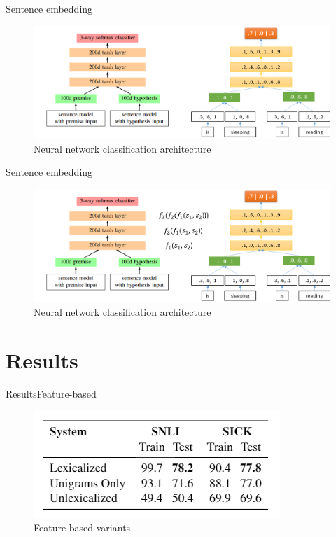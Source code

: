\documentclass{beamer}
\begin{document}
\begin{frame}{Sentence embedding}{\cite{snli:emnlp2015}}
  \begin{figure}[h]
    \centering
    \includegraphics[scale=0.38]{sentence_encoder}
    \caption{Neural network classification architecture}
  \end{figure}
\end{frame}

\begin{frame}{Sentence embedding}{\cite{snli:emnlp2015}}
  \begin{figure}[h]
    \centering
    \includegraphics[scale=0.38]{sentence_encoder2}
    \caption{Neural network classification architecture}
  \end{figure}
\end{frame}

\section{Results}

\begin{frame}{Results}{Feature-based}
  \begin{figure}[h]
    \centering
    \includegraphics[scale=0.6]{nli_result3}
    \caption{Feature-based variants}
  \end{figure}
\end{frame}
\end{document}
